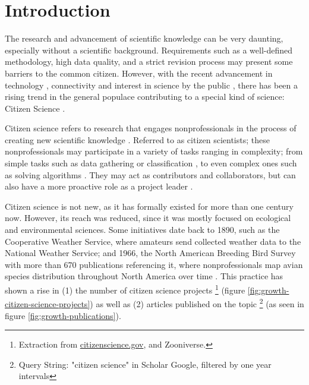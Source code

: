 \chapter*[Introduction]{Introduction}
\label{chap:introduction}

The research and advancement of scientific knowledge can be very daunting, especially without a scientific background. Requirements such as a well-defined methodology, high data quality, and a strict revision process may present some barriers to the common citizen. However, with the recent advancement in technology \cite{newman2012future}, connectivity \cite{newman2012future} and interest in science by the public \cite{silvertown2009new}, there has been a rising trend in the general populace contributing to a special kind of science: Citizen Science \cite{mckinley2017citizen}.

Citizen science refers to research that engages nonprofessionals in the process of creating new scientific knowledge \cite{bonney2014next}. Referred to as citizen scientists; these nonprofessionals may participate in a variety of tasks ranging in complexity; from simple tasks such as data gathering or classification \cite{barker2013pascal}, to even complex ones such as solving algorithms \cite{cooper2010predicting}. They may act as contributors and collaborators, but can also have a more proactive role as a project leader \cite{robinson2018ten}.

Citizen science is not new, as it has formally existed for more than one century now. However, its reach was reduced, since it was mostly focused on ecological and environmental sciences. Some initiatives date back to 1890, such as the Cooperative Weather Service, where amateurs send collected weather data to the National Weather Service; and 1966, the North American Breeding Bird Survey with more than 670 publications referencing it, where nonprofessionals map avian species distribution throughout North America over time \cite{kosmala2016assessing}. This practice has shown a rise in (1) the number of citizen science projects \footnote{Extraction from \href{citizenscience.gov}{citizenscience.gov}, and Zooniverse.} (figure \ref{fig:growth-citizen-science-projects}) as well as (2) articles published on the topic \footnote{Query String: "citizen science" in Scholar Google, filtered by one year intervals} (as seen in figure \ref{fig:growth-publications}).

\publicationdata

